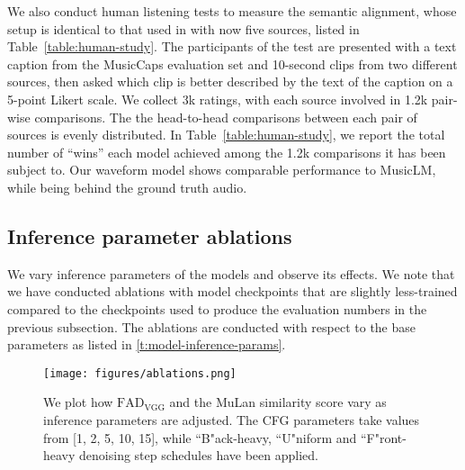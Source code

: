 \documentclass[nohyperref]{article}
\theoremstyle{plain}
\theoremstyle{definition}
\theoremstyle{remark}
\begin{document}
We also conduct human listening tests to measure the semantic alignment, whose setup is identical to that used in \cite{musiclm2023} with now five sources, listed in Table~\ref{table:human-study}. The participants of the test are presented with a text caption from the MusicCaps evaluation set and 10-second clips from two different sources, then asked which clip is better described by the text of the caption on a 5-point Likert scale. We collect 3k ratings, with each source involved in 1.2k pair-wise comparisons. The the head-to-head comparisons between each pair of sources is evenly distributed.
In Table~\ref{table:human-study}, we report the total number of ``wins'' each model achieved among the 1.2k comparisons it has been subject to. Our waveform model shows comparable performance to MusicLM, while being behind the ground truth audio.
\begin{table}[t!]
\caption{The number of wins in pair-wise comparisons of the human listening study. Higher indicates better semantic alignment.}
  \label{table:human-study}
  \vskip 0.05in
  \centering
\vskip-0.15in
\end{table}


\subsection{Inference parameter ablations}

We vary inference parameters of the models and observe its effects. We note that we have conducted ablations with model checkpoints that are slightly less-trained compared to the checkpoints used to produce the evaluation numbers in the previous subsection. The ablations are conducted with respect to the base parameters as listed in \cref{t:model-inference-params}.

\begin{figure}[ht]
\vskip 0.05in
\begin{center}
\centerline{\texttt{[image: figures/ablations.png]}}
\vskip -0.05in
\caption{We plot how $\text{FAD}_\text{VGG}$ and the MuLan similarity score vary as inference parameters are adjusted. The CFG parameters take values from [1, 2, 5, 10, 15], while ``B"ack-heavy, ``U"niform and ``F"ront-heavy denoising step schedules have been applied.}
\label{f:ablations}
\end{center}
\vskip -0.25in
\end{figure}
\end{document}
